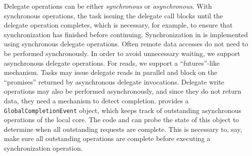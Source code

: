 
Delegate operations can be either {\em synchronous} or {\em asynchronous}.
With synchronous operations, the task issuing the delegate call blocks until
the delegate operation completes, which is necessary, for example, to ensure
that synchronization has finished before continuing. Synchronization in \Grappa
is implemented using synchronous delegate operations. Often remote data
accesses do not need to be performed synchronously. In order to avoid
unnecessary waiting, we support asynchronous delegate operations. For reads,
we support a ``futures''-like mechanism. Tasks may issue delegate reads in
parallel and block on the ``promises'' returned by asynchronous delegate
invocations. Delegate write operations may also be performed asynchronously,
and since they do not return data, they need a mechanism to detect completion.
\Grappa provides a \texttt{GlobalCompletionEvent} object, which keeps track of
outstanding asynchronous operations of the local core. The code and can probe
the state of this object to determine when all outstanding requests are
complete. This is necessary to, say, make sure all outstanding operations are
complete before executing a synchronization operation.


